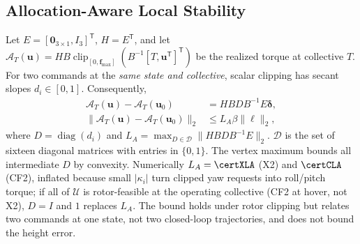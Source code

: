 \documentclass[letterpaper, 10 pt, conference]{ieeeconf}
\newcommand{\T}{^{\mathsf T}}
\newcommand{\clip}{\operatorname{clip}}
\begin{document}
\subsection{Allocation-Aware Local Stability}
\label{sec:local}
Let $E=[\bm0_{3\times1},I_3]\T$, $H=E\T$, and let
$\mathcal A_T(\bm u)=HB\clip_{[0,\bm f_{\max}]}(B^{-1}[T,\bm u\T]\T)$
be the realized torque at collective $T$. For two commands at the
\emph{same state and collective}, scalar clipping has secant slopes
$d_i\in[0,1]$. Consequently,
\begin{align}
 \mathcal A_T(\bm u)-\mathcal A_T(\bm u_0)
 &=HBDB^{-1}E\bm\delta,\\
 \|\mathcal A_T(\bm u)-\mathcal A_T(\bm u_0)\|_2
 &\le L_A\beta\|\bm\ell\|_2,
 \label{eq:allocbound}
\end{align}
where $D=\operatorname{diag}(d_i)$ and
$L_A=\max_{D\in\mathcal D}\|HBDB^{-1}E\|_2$.
$\mathcal D$ is the set of sixteen diagonal matrices with entries
in $\{0,1\}$. The vertex maximum bounds all intermediate $D$ by convexity.
Numerically $L_A=\certXLA$ (X2) and $\certCLA$ (CF2), inflated because
small $|\kappa_i|$ turn clipped yaw requests into roll/pitch torque; if all
of $\mathcal U$ is rotor-feasible at the operating collective (CF2 at hover,
not X2), $D=I$ and $1$ replaces $L_A$. The bound holds under rotor clipping
but relates two commands at one state, not two closed-loop trajectories, and
does not bound the height error.
\end{document}
